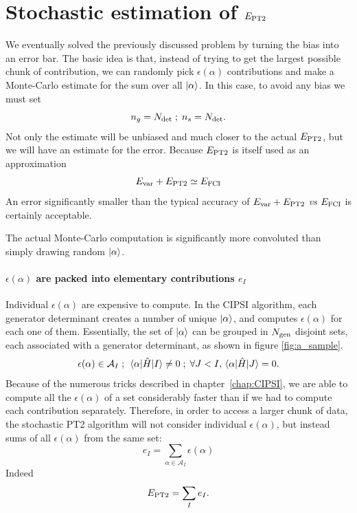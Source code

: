 \documentclass[./thesis.tex]{subfiles}
\begin{document}
\section{Stochastic estimation of $E_\text{PT2}$}

We eventually solved the previously discussed problem by turning the bias into an error bar. The basic idea is that, instead of trying to get the largest possible chunk of contribution, we can randomly pick $\epsilon(\alpha)$ contributions and make a Monte-Carlo estimate for the sum over all $\ket \alpha$. In this case, to avoid any bias we must set
\begin{equation}
n_g = {N_\text{det}} \; ; \; n_s = {N_\text{det}}.
\end{equation}
Not only the estimate will be unbiased and much closer to the actual $E_\text{PT2}$, but we will have an estimate for the error. Because $E_\text{PT2}$ is itself used as an approximation
\begin{equation}
E_\text{var} + E_\text{PT2} \simeq E_\text{FCI}
\end{equation}
An error significantly smaller than the typical accuracy of $E_\text{var} + E_\text{PT2}$ \textit{vs} $E_\text{FCI}$ is certainly acceptable.

The actual Monte-Carlo computation is significantly more convoluted than simply drawing random ${\ket{\alpha}}$.

\paragraph{$\epsilon(\alpha)$ are packed into elementary contributions $e_I$}
Individual $\epsilon(\alpha)$ are expensive to compute. In the CIPSI algorithm, each generator determinant creates a number of unique ${\ket{\alpha}}$, and computes $\epsilon(\alpha)$ for each one of them.
Essentially, the set of ${\ket{\alpha}}$ can be grouped in ${N_\text{gen}}$ disjoint sets, each associated with a generator determinant, as shown in figure \ref{fig:a_sample}.
\begin{equation}
\epsilon(\alpha) \in \mathcal{A}_I \; ; \; \mel{\alpha}{\hat{H}}{I} \neq 0 \; ; \;   \forall J < I, \mel{\alpha}{\hat{H}}{J} = 0.
\end{equation}
Because of the numerous tricks described in chapter~\ref{chap:CIPSI}, we are able to compute all the $\epsilon(\alpha)$ of a set considerably faster than if we had to compute each contribution separately. Therefore, in order to access a larger chunk of data, the stochastic PT2 algorithm will not consider individual $\epsilon(\alpha)$, but instead sums of all $\epsilon(\alpha)$ from the same set:
\begin{equation}
e_I = \sum_{\alpha \in \mathcal{A}_I} \epsilon(\alpha)
\end{equation}
Indeed
\begin{equation}
E_\text{PT2} = \sum_{I} e_I.
\end{equation}
\end{document}
